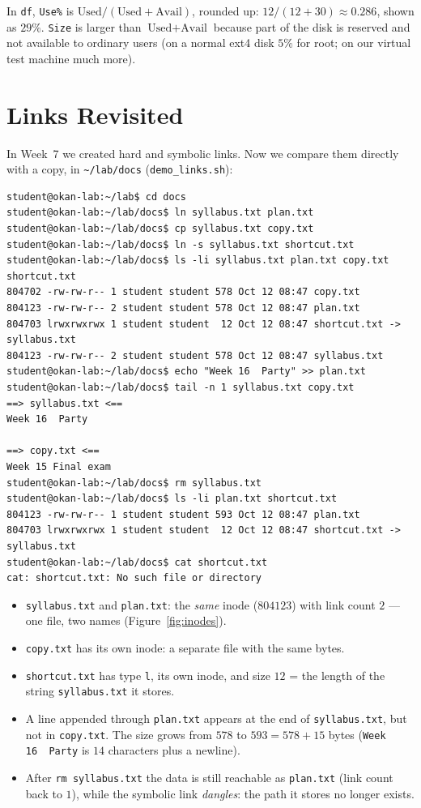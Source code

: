 \documentclass[11pt,a4paper]{article}
\newcommand{\cmd}[1]{\texttt{#1}}
\begin{document}
In \cmd{df}, \texttt{Use\%} is $\text{Used}/(\text{Used} + \text{Avail})$, rounded up: $12/(12+30) \approx 0.286$, shown as $29\%$. \texttt{Size} is larger than $\text{Used} + \text{Avail}$ because part of the disk is reserved and not available to ordinary users (on a normal ext4 disk $5\%$ for root; on our virtual test machine much more).

\section{Links Revisited}
\label{sec:links}

In Week~7 we created hard and symbolic links. Now we compare them directly with a copy, in \texttt{\textasciitilde/lab/docs} (\cmd{demo\_links.sh}):

\begin{lstlisting}[style=term]
student@okan-lab:~/lab$ cd docs
student@okan-lab:~/lab/docs$ ln syllabus.txt plan.txt
student@okan-lab:~/lab/docs$ cp syllabus.txt copy.txt
student@okan-lab:~/lab/docs$ ln -s syllabus.txt shortcut.txt
student@okan-lab:~/lab/docs$ ls -li syllabus.txt plan.txt copy.txt shortcut.txt
804702 -rw-rw-r-- 1 student student 578 Oct 12 08:47 copy.txt
804123 -rw-rw-r-- 2 student student 578 Oct 12 08:47 plan.txt
804703 lrwxrwxrwx 1 student student  12 Oct 12 08:47 shortcut.txt -> syllabus.txt
804123 -rw-rw-r-- 2 student student 578 Oct 12 08:47 syllabus.txt
student@okan-lab:~/lab/docs$ echo "Week 16  Party" >> plan.txt
student@okan-lab:~/lab/docs$ tail -n 1 syllabus.txt copy.txt
==> syllabus.txt <==
Week 16  Party

==> copy.txt <==
Week 15 Final exam
student@okan-lab:~/lab/docs$ rm syllabus.txt
student@okan-lab:~/lab/docs$ ls -li plan.txt shortcut.txt
804123 -rw-rw-r-- 1 student student 593 Oct 12 08:47 plan.txt
804703 lrwxrwxrwx 1 student student  12 Oct 12 08:47 shortcut.txt -> syllabus.txt
student@okan-lab:~/lab/docs$ cat shortcut.txt
cat: shortcut.txt: No such file or directory
\end{lstlisting}

\begin{itemize}
  \item \texttt{syllabus.txt} and \texttt{plan.txt}: the \emph{same} inode ($804123$) with link count $2$ --- one file, two names (Figure~\ref{fig:inodes}).
  \item \texttt{copy.txt} has its own inode: a separate file with the same bytes.
  \item \texttt{shortcut.txt} has type \texttt{l}, its own inode, and size $12$ = the length of the string \texttt{syllabus.txt} it stores.
  \item A line appended through \texttt{plan.txt} appears at the end of \texttt{syllabus.txt}, but not in \texttt{copy.txt}. The size grows from $578$ to $593 = 578 + 15$ bytes (\texttt{Week 16\ \ Party} is $14$ characters plus a newline).
  \item After \cmd{rm syllabus.txt} the data is still reachable as \texttt{plan.txt} (link count back to $1$), while the symbolic link \emph{dangles}: the path it stores no longer exists.
\end{itemize}
\end{document}
